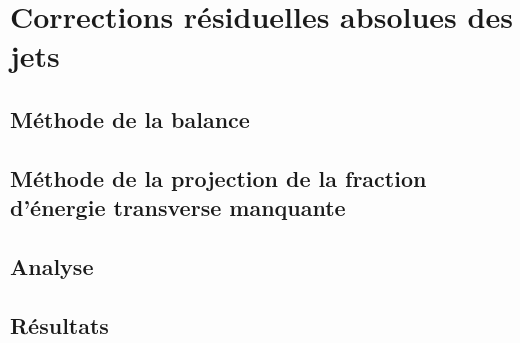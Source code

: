 \section{Corrections résiduelles absolues des jets}

\subsection{Méthode de la balance}

\subsection{Méthode de la projection de la fraction d'énergie transverse manquante}

\subsection{Analyse}

\subsection{Résultats}
